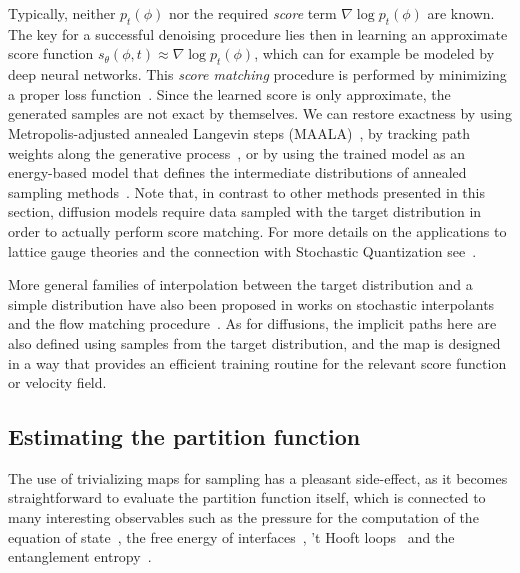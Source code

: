 \documentclass[12pt]{article}
\begin{document}
Typically, neither $p_t(\phi)$ nor the required \textit{score} term $\nabla \log p_t(\phi)$ are known. The key for a successful denoising procedure lies then in learning an approximate score function $s_\theta (\phi,t) \approx \nabla \log p_t(\phi)$, which can for example be modeled by deep neural networks. This \textit{score matching} procedure is performed by minimizing a proper loss function~\cite{Song:2021xxx}. Since the learned score is only approximate, the generated samples are not exact by themselves. We can restore exactness by using Metropolis-adjusted annealed Langevin steps (MAALA)~\cite{Zhu:2025pmw}, by tracking path weights along the generative process~\cite{Wang:2026pmv,Chen:2026bqw}, or by using the trained model as an energy-based model that defines the intermediate distributions of annealed sampling methods~\cite{Sexty:2026aym,Kanwar:2026prt}.
Note that, in contrast to other methods presented in this section, diffusion models require data sampled with the target distribution in order to actually perform score matching. For more details on the applications to lattice gauge theories and the connection with Stochastic Quantization see~\cite{Wang:2023exq,Zhu:2025pmw,Aarts:2025lpi,Vega:2025hgz,Alharazin:2026lcb,Aarts:2026zzr,Komijani:2026lan,Tomiya:2026tbc,Tomiya:2026fjk}.

More general families of interpolation between the target distribution and a simple distribution have also been proposed in works on stochastic interpolants~\cite{Albergo:2022iol,Albergo:2023xxx} and the flow matching procedure~\cite{Lipman:2023xxx}. As for diffusions, the implicit paths here are also defined using samples from the target distribution, and the map is designed in a way that provides an efficient training routine for the relevant score function or velocity field.

\subsection{Estimating the partition function}\label{flow-partition}

The use of trivializing maps for sampling has a pleasant side-effect, as it becomes straightforward to evaluate the partition function itself, which is connected to many interesting observables such as the pressure for the computation of the equation of state~\cite{Engels:1990vr}, the free energy of interfaces~\cite{Binder_2011,Caselle:2006dv}, 't Hooft loops~\cite{deForcrand:2000fi} and the entanglement entropy~\cite{Calabrese:2004eu}.
\end{document}
